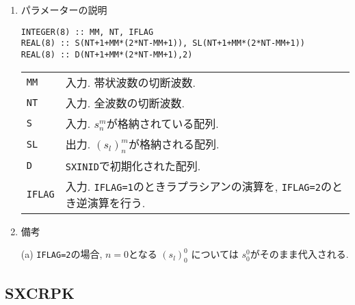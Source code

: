 \documentclass[a4j]{jsarticle}
\begin{document}
\begin{enumerate}
\item パラメーターの説明

\begin{verbatim}
INTEGER(8) :: MM, NT, IFLAG
REAL(8) :: S(NT+1+MM*(2*NT-MM+1)), SL(NT+1+MM*(2*NT-MM+1))
REAL(8) :: D(NT+1+MM*(2*NT-MM+1),2)
\end{verbatim}

\begin{tabular}{ll}
\texttt{MM} & 入力. 帯状波数の切断波数.\\  
\texttt{NT} & 入力. 全波数の切断波数.\\
\texttt{S} & 入力. $s^m_n$が格納されている配列.\\
\texttt{SL} & 出力. $(s_l)^m_n$が格納される配列.\\
\texttt{D} & \texttt{SXINID}で初期化された配列.\\
\texttt{IFLAG} & 入力. \texttt{IFLAG=1}のときラプラシアンの演算を,
\texttt{IFLAG=2}のとき逆演算を行う.
\end{tabular}

\item 備考

(a) \texttt{IFLAG=2}の場合, $n=0$となる $(s_l)^0_0$ については
$s^0_0$がそのまま代入される.

\end{enumerate}


\subsection{SXCRPK}
\end{document}
